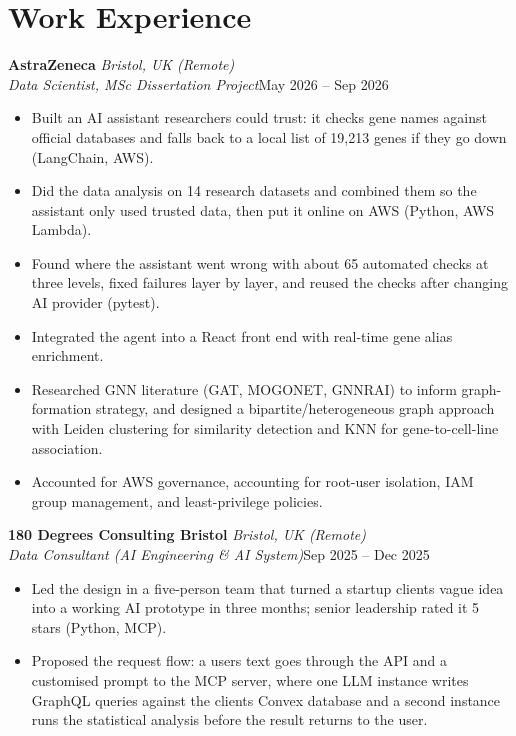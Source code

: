 \documentclass[a4paper,11pt]{article}
\newcommand{\role}[4]{%
  \textbf{#1}{\color{muted}\,\textperiodcentered\,\textit{#2}}\\
  \textit{#4}\hfill{\color{muted}#3}\par}
\newcommand{\gap}{\vspace{5pt}}
\begin{document}
\section{Work Experience}
\role{AstraZeneca}{Bristol, UK (Remote)}{May 2026 – Sep 2026}{Data Scientist, MSc Dissertation Project}
\begin{itemize}
  \item Built an AI assistant researchers could trust: it checks gene names against official databases and falls back to a local list of 19,213 genes if they go down (LangChain, AWS).
  \item Did the data analysis on 14 research datasets and combined them so the assistant only used trusted data, then put it online on AWS (Python, AWS Lambda).
  \item Found where the assistant went wrong with about 65 automated checks at three levels, fixed failures layer by layer, and reused the checks after changing AI provider (pytest).
  \item Integrated the agent into a React front end with real-time gene alias enrichment.
  \item Researched GNN literature (GAT, MOGONET, GNNRAI) to inform graph-formation strategy, and designed a bipartite/heterogeneous graph approach with Leiden clustering for similarity detection and KNN for gene-to-cell-line association.
  \item Accounted for AWS governance, accounting for root-user isolation, IAM group management, and least-privilege policies.
\end{itemize}
\gap
{}
\role{180 Degrees Consulting Bristol}{Bristol, UK (Remote)}{Sep 2025 – Dec 2025}{Data Consultant (AI Engineering \& AI System)}
\begin{itemize}
  \item Led the design in a five-person team that turned a startup client\textquotesingle{}s vague idea into a working AI prototype in three months; senior leadership rated it 5 stars (Python, MCP).
  \item Proposed the request flow: a user\textquotesingle{}s text goes through the API and a customised prompt to the MCP server, where one LLM instance writes GraphQL queries against the client\textquotesingle{}s Convex database and a second instance runs the statistical analysis before the result returns to the user.
\end{itemize}
\gap
{}
\end{document}
